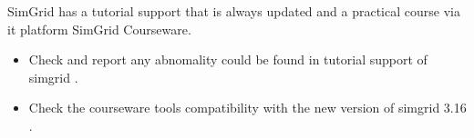 \begin{frame}
SimGrid has a tutorial support that is always updated and a practical course via it platform SimGrid Courseware. %
\begin{block}{}
\begin{itemize}
\item Check and report any abnomality could be found in tutorial support of simgrid \href{http://simgrid.gforge.inria.fr/}{}.\\
\item Check the courseware tools compatibility with the new version of simgrid 3.16 \href{https://simgrid.github.io/SMPI\_CourseWare/}{}.   
\end{itemize}
\end{block}
\end{frame}

